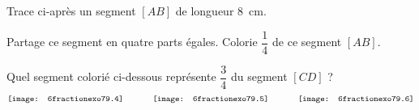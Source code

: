  \begin{myenumerate}
    \item Trace ci-après un segment $[AB]$ de longueur 8~cm.
\vspace{1cm}
    \item Partage ce segment en quatre parts égales. Colorie $\dfrac14$
      de ce segment $[AB]$.
    \item Quel segment colorié ci-dessous représente $\dfrac34$ du
      segment $[CD]$ ?
      \[\texttt{[image: 6fractionexo79.4]}\kern0.1\linewidth\texttt{[image: 6fractionexo79.5]}\kern0.1\linewidth\texttt{[image: 6fractionexo79.6]}\]
  \end{myenumerate}
